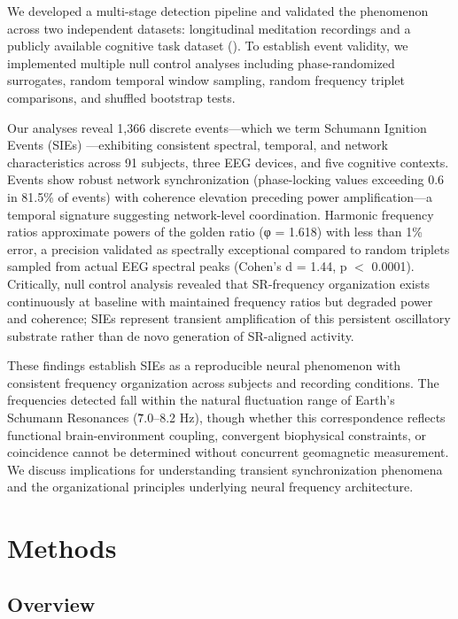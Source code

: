 \documentclass[11pt,a4paper]{article}
\begin{document}
We developed a multi-stage detection pipeline and validated the phenomenon across two independent datasets: longitudinal meditation recordings and a publicly available cognitive task dataset (\cite{albuquerque2024physf}). To establish event validity, we implemented multiple null control analyses including phase-randomized surrogates, random temporal window sampling, random frequency triplet comparisons, and shuffled bootstrap tests.

Our analyses reveal 1,366 discrete events—which we term Schumann Ignition Events (SIEs) —exhibiting consistent spectral, temporal, and network characteristics across 91 subjects, three EEG devices, and five cognitive contexts. Events show robust network synchronization (phase-locking values exceeding 0.6 in 81.5\% of events) with coherence elevation preceding power amplification—a temporal signature suggesting network-level coordination. Harmonic frequency ratios approximate powers of the golden ratio (φ = 1.618) with less than 1\% error, a precision validated as spectrally exceptional compared to random triplets sampled from actual EEG spectral peaks (Cohen's d = 1.44, p $<$ 0.0001). Critically, null control analysis revealed that SR-frequency organization exists continuously at baseline with maintained frequency ratios but degraded power and coherence; SIEs represent transient amplification of this persistent oscillatory substrate rather than de novo generation of SR-aligned activity.

These findings establish SIEs as a reproducible neural phenomenon with consistent frequency organization across subjects and recording conditions. The frequencies detected fall within the natural fluctuation range of Earth's Schumann Resonances (\~7.0–8.2 Hz), though whether this correspondence reflects functional brain-environment coupling, convergent biophysical constraints, or coincidence cannot be determined without concurrent geomagnetic measurement. We discuss implications for understanding transient synchronization phenomena and the organizational principles underlying neural frequency architecture.

\section{Methods}

\subsection{Overview}
\end{document}

